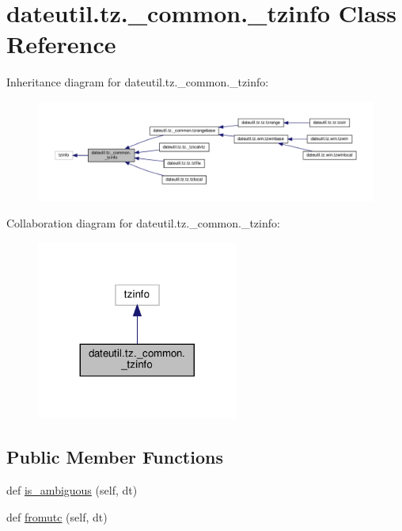 \hypertarget{classdateutil_1_1tz_1_1__common_1_1__tzinfo}{}\section{dateutil.\+tz.\+\_\+common.\+\_\+tzinfo Class Reference}
\label{classdateutil_1_1tz_1_1__common_1_1__tzinfo}


Inheritance diagram for dateutil.\+tz.\+\_\+common.\+\_\+tzinfo\+:
\nopagebreak
\begin{figure}[H]
\begin{center}
\leavevmode
\includegraphics[width=350pt]{classdateutil_1_1tz_1_1__common_1_1__tzinfo__inherit__graph}
\end{center}
\end{figure}


Collaboration diagram for dateutil.\+tz.\+\_\+common.\+\_\+tzinfo\+:
\nopagebreak
\begin{figure}[H]
\begin{center}
\leavevmode
\includegraphics[width=188pt]{classdateutil_1_1tz_1_1__common_1_1__tzinfo__coll__graph}
\end{center}
\end{figure}
\subsection*{Public Member Functions}
\begin{DoxyCompactItemize}
\item 
def \hyperlink{classdateutil_1_1tz_1_1__common_1_1__tzinfo_a13210a0c147bb97440e89babe38ac60c}{is\+\_\+ambiguous} (self, dt)
\item 
def \hyperlink{classdateutil_1_1tz_1_1__common_1_1__tzinfo_ab3260efb99632430daa43df1b481e8e7}{fromutc} (self, dt)
\end{DoxyCompactItemize}


